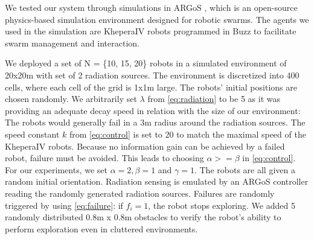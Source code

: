 We tested our system through simulations in ARGoS
\cite{Pinciroli:SI2012}, which is an open-source physics-based
simulation environment designed for robotic swarms. The agents we used
in the simulation are KheperaIV robots 
\cite{kteam2021kheperaiv} programmed in Buzz \cite{pinciroliBuzz2016} to facilitate swarm
management and interaction. 



We deployed a set of N = \{10, 15, 20\} robots in a simulated
environment of 20x20m with set of 2 radiation sources. The environment is discretized into 400 cells, where each cell of the grid is 1x1m large. The robots'
initial positions are chosen randomly. We arbitrarily set $\lambda$ from
\eqref{eq:radiation} to be 5 as it was providing an adequate decay speed in relation with the size of our environment: The robots would generally fail in a 3m radius around the radiation sources. The speed constant $k$ from \eqref{eq:control} is set to
$20$ to match the maximal speed of the KheperaIV robots. Because no information gain can be achieved by a failed robot, failure must be avoided. This
leads to choosing $\alpha >= \beta$ in \eqref{eq:control}. For our
experiments, we set $\alpha=2, \beta=1$ and $\gamma=1$. The robots are
all given a random initial orientation. Radiation sensing is emulated
by an ARGoS controller reading the randomly generated radiation
sources. Failures are randomly triggered by using \eqref{eq:failure}:
if $f_i=1$, the robot stops exploring. We added 5 randomly distributed
0.8m x 0.8m obstacles to verify the robot's ability to
perform exploration even in cluttered environments.

    
